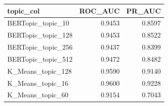 \begin{tabular}{lrr}
\toprule
topic_col & ROC_AUC & PR_AUC \\
\midrule
BERTopic_topic_10 & 0.9453 & 0.8597 \\
BERTopic_topic_128 & 0.9453 & 0.8522 \\
BERTopic_topic_256 & 0.9437 & 0.8399 \\
BERTopic_topic_512 & 0.9472 & 0.8482 \\
K_Means_topic_128 & 0.9590 & 0.9140 \\
K_Means_topic_16 & 0.9600 & 0.9228 \\
K_Means_topic_60 & 0.9154 & 0.7043 \\
\bottomrule
\end{tabular}
